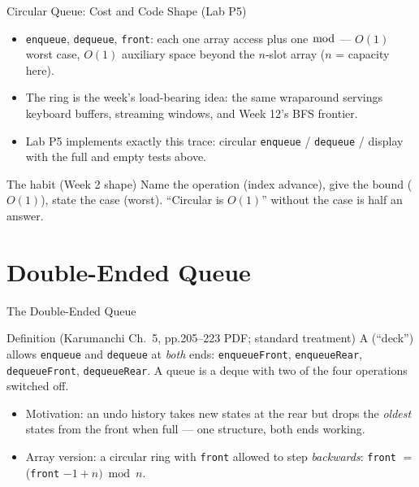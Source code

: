 \documentclass[aspectratio=169]{beamer}
\begin{document}
\begin{frame}{Circular Queue: Cost and Code Shape (Lab P5)}
  \begin{itemize}
    \item \texttt{enqueue}, \texttt{dequeue}, \texttt{front}: each one array
      access plus one $\bmod$ --- $O(1)$ worst case, $O(1)$ auxiliary space
      beyond the $n$-slot array ($n$ = capacity here).
    \item The ring is the week's load-bearing idea: the same wraparound
      servings keyboard buffers, streaming windows, and Week 12's BFS frontier.
    \item Lab P5 implements exactly this trace: circular \texttt{enqueue} /
      \texttt{dequeue} / display with the full and empty tests above.
  \end{itemize}
  \begin{exampleblock}{The habit (Week 2 shape)}
    Name the operation (index advance), give the bound ($O(1)$), state the
    case (worst). ``Circular is $O(1)$'' without the case is half an answer.
  \end{exampleblock}
\end{frame}


\section{Double-Ended Queue}


\begin{frame}{The Double-Ended Queue}
  \begin{block}{Definition (Karumanchi Ch.~5, pp.205--223 PDF; standard
    treatment)
    \cite{Karumanchi2017_data_structures_algorithms_made_easy}}
    A  (``deck'') allows \texttt{enqueue} and \texttt{dequeue} at
    \emph{both} ends: \texttt{enqueueFront}, \texttt{enqueueRear},
    \texttt{dequeueFront}, \texttt{dequeueRear}. A queue is a deque with two
    of the four operations switched off.
  \end{block}
  \begin{itemize}
    \item Motivation: an undo history takes new states at the rear but drops
      the \emph{oldest} states from the front when full --- one structure,
      both ends working.
    \item Array version: a circular ring with \texttt{front} allowed to step
      \emph{backwards}: \texttt{front} $=$ (\texttt{front} $- 1 + n) \bmod n$.
  \end{itemize}
\end{frame}
\end{document}
